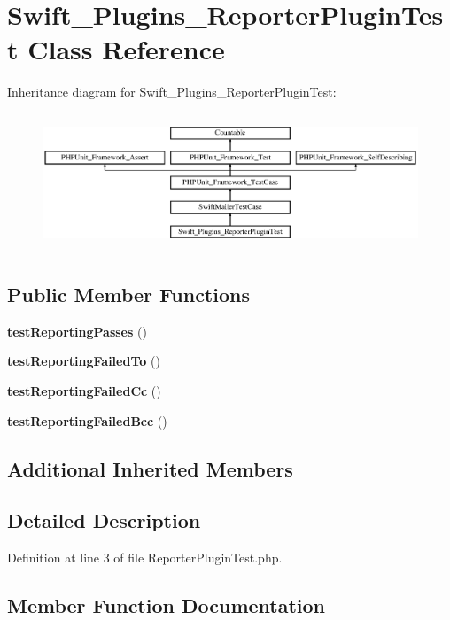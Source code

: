 \section{Swift\+\_\+\+Plugins\+\_\+\+Reporter\+Plugin\+Test Class Reference}
\label{class_swift___plugins___reporter_plugin_test}
Inheritance diagram for Swift\+\_\+\+Plugins\+\_\+\+Reporter\+Plugin\+Test\+:\begin{figure}[H]
\begin{center}
\leavevmode
\includegraphics[height=4.129793cm]{class_swift___plugins___reporter_plugin_test}
\end{center}
\end{figure}
\subsection*{Public Member Functions}
\begin{DoxyCompactItemize}
\item 
{\bf test\+Reporting\+Passes} ()
\item 
{\bf test\+Reporting\+Failed\+To} ()
\item 
{\bf test\+Reporting\+Failed\+Cc} ()
\item 
{\bf test\+Reporting\+Failed\+Bcc} ()
\end{DoxyCompactItemize}
\subsection*{Additional Inherited Members}


\subsection{Detailed Description}


Definition at line 3 of file Reporter\+Plugin\+Test.\+php.



\subsection{Member Function Documentation}
